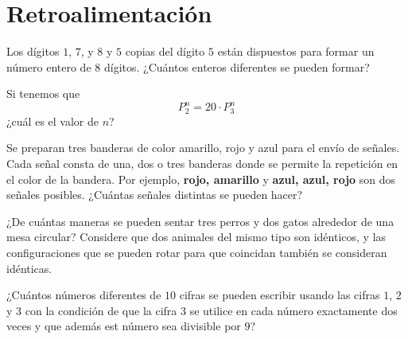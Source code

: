 \documentclass[12pt]{article}
\begin{document}
\section{Retroalimentación}
\begin{problema}
Los dígitos $1$, $7$, y $8$ y $5$ copias del dígito $5$ están dispuestos para formar un número entero de $8$ dígitos. ¿Cuántos enteros diferentes se pueden formar?
\end{problema}

\begin{problema}
Si tenemos que 
\[P^n_2=20\cdot P^n_3\]
¿cuál es el valor de $n$?
\end{problema}
\begin{problema}
Se preparan tres banderas de color amarillo, rojo y azul para el envío de señales. Cada señal consta de una, dos o tres banderas donde se permite la repetición en el color de la bandera. Por ejemplo, \textbf{rojo, amarillo} y \textbf{azul, azul, rojo} son dos señales posibles. ¿Cuántas señales distintas se pueden hacer?
\end{problema}

\begin{problema}
    ¿De cuántas maneras se pueden sentar tres perros y dos gatos alrededor de una mesa circular? Considere que dos animales del mismo tipo son idénticos, y las configuraciones que se pueden rotar para que coincidan también se consideran idénticas.
\end{problema}

\begin{problema}
¿Cuántos números diferentes de $10$ cifras se pueden escribir usando las cifras $1$, $2$ y $3$ con la condición de que la cifra $3$ se utilice en cada número exactamente dos veces y que además est número sea divisible por $9$?
\end{problema}
\end{document}
